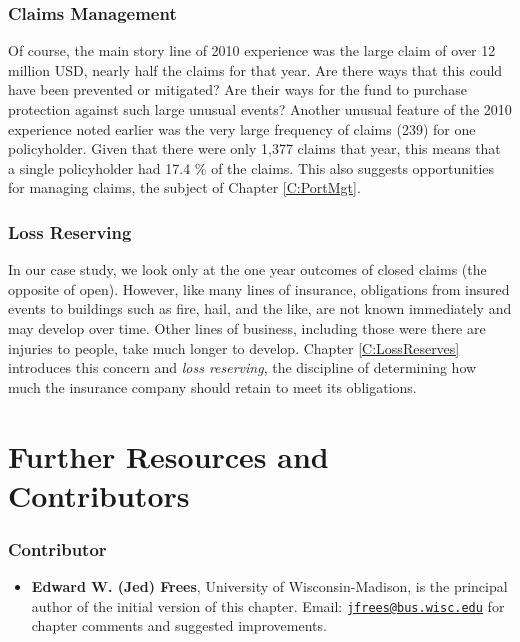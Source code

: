 \documentclass[]{book}
\providecommand{\tightlist}{%
  \setlength{\itemsep}{0pt}\setlength{\parskip}{0pt}}
\theoremstyle{definition}
\theoremstyle{definition}
\theoremstyle{definition}
\theoremstyle{remark}
\begin{document}
\subsubsection*{Claims Management}\label{claims-management}

Of course, the main story line of 2010 experience was the large claim of
over 12 million USD, nearly half the claims for that year. Are there
ways that this could have been prevented or mitigated? Are their ways
for the fund to purchase protection against such large unusual events?
Another unusual feature of the 2010 experience noted earlier was the
very large frequency of claims (239) for one policyholder. Given that
there were only 1,377 claims that year, this means that a single
policyholder had 17.4 \% of the claims. This also suggests opportunities
for managing claims, the subject of Chapter \ref{C:PortMgt}.

\subsubsection*{Loss Reserving}\label{loss-reserving}

In our case study, we look only at the one year outcomes of closed
claims (the opposite of open). However, like many lines of insurance,
obligations from insured events to buildings such as fire, hail, and the
like, are not known immediately and may develop over time. Other lines
of business, including those were there are injuries to people, take
much longer to develop. Chapter \ref{C:LossReserves} introduces this
concern and \emph{loss reserving}, the discipline of determining how
much the insurance company should retain to meet its obligations.

\section{Further Resources and
Contributors}\label{Intro-further-reading-and-resources}

\subsubsection*{Contributor}\label{contributor}

\begin{itemize}
\tightlist
\item
  \textbf{Edward W. (Jed) Frees}, University of Wisconsin-Madison, is
  the principal author of the initial version of this chapter. Email:
  \href{mailto:jfrees@bus.wisc.edu}{\nolinkurl{jfrees@bus.wisc.edu}} for
  chapter comments and suggested improvements.
\end{itemize}
\end{document}
